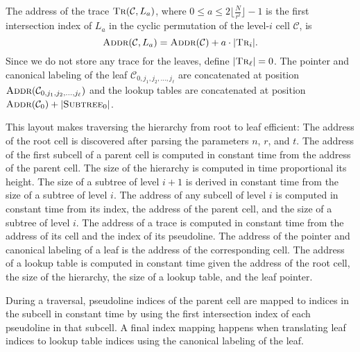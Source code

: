 The address of the trace \(\textsc{Tr}(\mathcal{C}, L_a)\),
where
\(0 \leq a \leq 2 \lfloor \frac{N}{r^{i}} \rfloor - 1\) is the first intersection
index of \(L_a\) in the cyclic permutation of the level-\(i\) cell
\(\mathcal{C}\),
is
%
\begin{displaymath}
  \textsc{Addr}(\mathcal{C}, L_a)
  =
  \textsc{Addr}(\mathcal{C})
  + a \cdot |\textsc{Tr}_{i}|.
\end{displaymath}
%
Since we do not store any trace for the leaves,
define \(| \textsc{Tr}_{\ell} | = 0\).
The pointer and canonical labeling of the leaf
\(\mathcal{C}_{0, j_1, j_2, \ldots, j_{\ell}}\)
are concatenated at position
\(\textsc{Addr}(\mathcal{C}_{0, j_1, j_2, \ldots, j_{\ell}})\)
%
and
%
the lookup tables are concatenated at position
\(
\textsc{Addr}(\mathcal{C}_{0})
+
| \textsc{Subtree}_{0} |
\).

This layout makes traversing the hierarchy from root to leaf efficient:
%
The address of the root cell is discovered after parsing the parameters \(n\),
\(r\), and \(t\).
%
The address of the first subcell of a parent cell is computed in constant time
from the address of the parent cell.
%
The size of the hierarchy is computed in time proportional its height.
%
The size of a subtree of level \(i+1\) is derived in constant time from the
size of a subtree of level \(i\).
%
The address of any subcell of level \(i\) is computed in constant time from its
index, the address of the parent cell, and the size of a subtree of level
\(i\).
%
The address of a trace is computed in constant time from the address of its
cell and the index of its pseudoline.
%
The address of the pointer and canonical labeling of a leaf
is the address of the corresponding cell.
%
The address of a lookup table is computed in constant time given the address of
the root cell, the size of the hierarchy, the size of a lookup table, and the
leaf pointer.

During a traversal, pseudoline indices of the parent cell are mapped to
indices in the subcell in constant time by using the first intersection index
of each pseudoline in that subcell. A final index mapping happens when translating leaf indices
to lookup table indices using the canonical labeling of the leaf.
